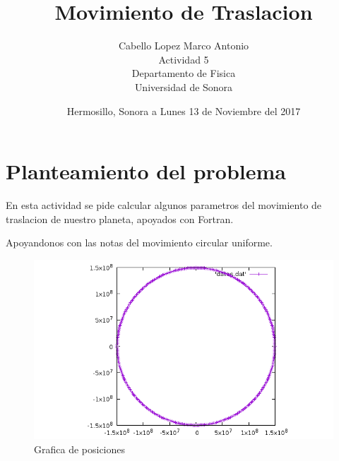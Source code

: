 \documentclass[12pt,a4paper,twoside]{article}
\author{Cabello Lopez Marco Antonio\\
Actividad 5\\
Departamento de Fisica\\
Universidad de Sonora}
\date{Hermosillo, Sonora a Lunes 13 de Noviembre del 2017}
\title{\textbf{Movimiento de Traslacion}}
\begin{document}
\maketitle
\section{Planteamiento del problema}
En esta actividad se pide calcular algunos parametros del movimiento de traslacion de nuestro planeta, apoyados con Fortran.

Apoyandonos con las notas del movimiento circular uniforme.

\begin{figure}[h!]
  \includegraphics[width=\linewidth]{movt.png}
  \caption{Grafica de posiciones}
  \label{fig:Grafica}
\end{figure}
\end{document}
